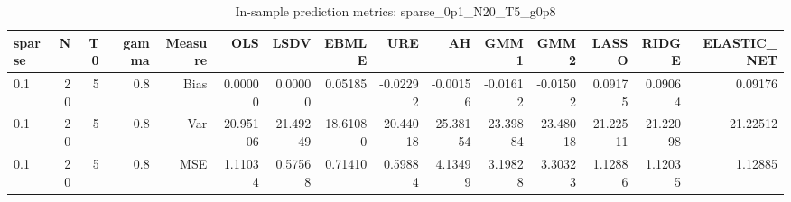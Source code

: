 \begin{table}[!htbp]\centering
\caption{In-sample prediction metrics: sparse_0p1_N20_T5_g0p8}
\label{tab:table2_sparse_0p1_N20_T5_g0p8}
\begin{tabular}{lrrrrrrrrrrrrrr}
\hline
sparse & N & T0 & gamma & Measure & OLS & LSDV & EBMLE & URE & AH & GMM1 & GMM2 & LASSO & RIDGE & ELASTIC_NET \\
\hline
0.1 & 20 & 5 & 0.8 & Bias & 0.00000 & 0.00000 & 0.05185 & -0.02292 & -0.00156 & -0.01612 & -0.01502 & 0.09175 & 0.09064 & 0.09176 \\
0.1 & 20 & 5 & 0.8 & Var & 20.95106 & 21.49249 & 18.61080 & 20.44018 & 25.38154 & 23.39884 & 23.48018 & 21.22511 & 21.22098 & 21.22512 \\
0.1 & 20 & 5 & 0.8 & MSE & 1.11034 & 0.57568 & 0.71410 & 0.59884 & 4.13499 & 3.19828 & 3.30323 & 1.12886 & 1.12035 & 1.12885 \\
\hline
\end{tabular}
\end{table}

